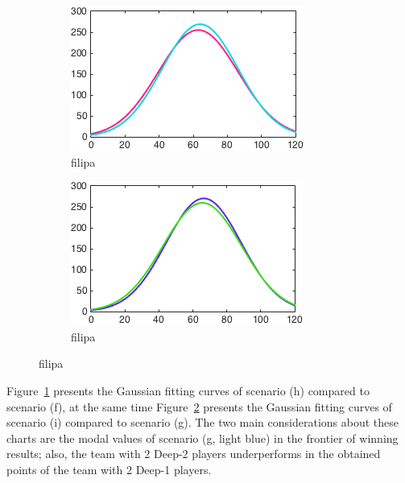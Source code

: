 \begin{figure}[h]
        \centering
        \begin{subfigure}[h]{0.4\textwidth}
                \includegraphics[width=\textwidth]{./img/4/FH}
                \caption{filipa}
                \label{fig:FH}
        \end{subfigure}
        \begin{subfigure}[h]{0.4\textwidth}
                \includegraphics[width=\textwidth]{./img/4/GI}
                \caption{filipa}
                \label{fig:GI}
        \end{subfigure}
        \caption{filipa}
        \label{fig:FGHI}
\end{figure}

Figure~\ref{fig:FH} presents the Gaussian fitting curves of scenario (h) compared to scenario (f), at the same time Figure~\ref{fig:GI} presents the Gaussian fitting curves of scenario (i) compared to scenario (g).
The two main considerations about these charts are the modal values of scenario (g, light blue) in the frontier of winning results; also, the team with 2 Deep-2 players underperforms in the obtained points of the team with 2 Deep-1 players.


